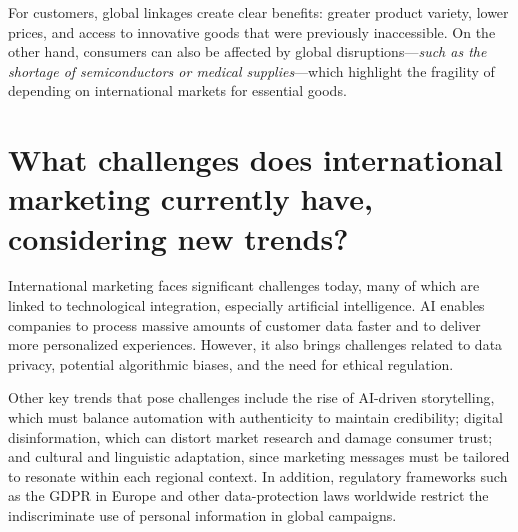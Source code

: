 \documentclass[letterpaper, 12pt]{article}
\begin{document}
For customers, global linkages create clear benefits: greater product variety,
lower prices, and access to innovative goods that were previously inaccessible.
On the other hand, consumers can also be affected by global
disruptions—\textit{such as the shortage of semiconductors or medical
    supplies}—which highlight the fragility of depending on international markets
for essential goods.

\section{What challenges does international marketing currently have, considering new trends?}

International marketing faces significant challenges today, many of which are
linked to technological integration, especially artificial intelligence. AI
enables companies to process massive amounts of customer data faster and to
deliver more personalized experiences. However, it also brings challenges
related to data privacy, potential algorithmic biases, and the need for ethical
regulation.

Other key trends that pose challenges include the rise of AI-driven
storytelling, which must balance automation with authenticity to maintain
credibility; digital disinformation, which can distort market research and
damage consumer trust; and cultural and linguistic adaptation, since marketing
messages must be tailored to resonate within each regional context. In
addition, regulatory frameworks such as the GDPR in Europe and other
data-protection laws worldwide restrict the indiscriminate use of personal
information in global campaigns.

\newpage

\printbibliography
\end{document}

